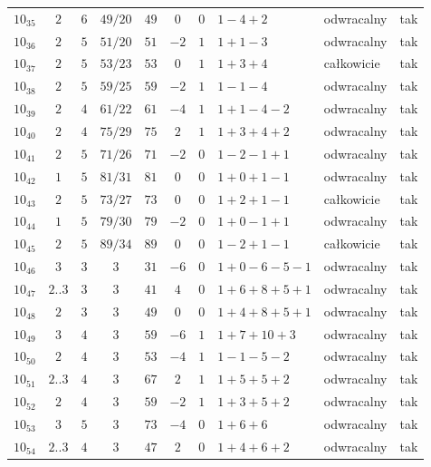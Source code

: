 \begin{longtable}{lccccccllc}
$10_{35}$  & $2$   & $6$ & $49/20$ & $49$  & $0$  & $0$ & $1-4+2$       & odwracalny & tak \\
$10_{36}$  & $2$   & $5$ & $51/20$ & $51$  & $-2$ & $1$ & $1+1-3$       & odwracalny & tak \\
$10_{37}$  & $2$   & $5$ & $53/23$ & $53$  & $0$  & $1$ & $1+3+4$       & całkowicie & tak \\
$10_{38}$  & $2$   & $5$ & $59/25$ & $59$  & $-2$ & $1$ & $1-1-4$       & odwracalny & tak \\
$10_{39}$  & $2$   & $4$ & $61/22$ & $61$  & $-4$ & $1$ & $1+1-4-2$     & odwracalny & tak \\
$10_{40}$  & $2$   & $4$ & $75/29$ & $75$  & $2$  & $1$ & $1+3+4+2$     & odwracalny & tak \\
$10_{41}$  & $2$   & $5$ & $71/26$ & $71$  & $-2$ & $0$ & $1-2-1+1$     & odwracalny & tak \\
$10_{42}$  & $1$   & $5$ & $81/31$ & $81$  & $0$  & $0$ & $1+0+1-1$     & odwracalny & tak \\
$10_{43}$  & $2$   & $5$ & $73/27$ & $73$  & $0$  & $0$ & $1+2+1-1$     & całkowicie & tak \\
$10_{44}$  & $1$   & $5$ & $79/30$ & $79$  & $-2$ & $0$ & $1+0-1+1$     & odwracalny & tak \\
$10_{45}$  & $2$   & $5$ & $89/34$ & $89$  & $0$  & $0$ & $1-2+1-1$     & całkowicie & tak \\
$10_{46}$  & $3$   & $3$ & $3$ & $31$  & $-6$ & $0$ & $1+0-6-5-1$   & odwracalny & tak \\
$10_{47}$  & $2..3$ & $3$ & $3$ & $41$  & $4$  & $0$ & $1+6+8+5+1$   & odwracalny & tak \\
$10_{48}$  & $2$   & $3$ & $3$ & $49$  & $0$  & $0$ & $1+4+8+5+1$   & odwracalny & tak \\
$10_{49}$  & $3$   & $4$ & $3$ & $59$  & $-6$ & $1$ & $1+7+10+3$    & odwracalny & tak \\
$10_{50}$  & $2$   & $4$ & $3$ & $53$  & $-4$ & $1$ & $1-1-5-2$     & odwracalny & tak \\
$10_{51}$  & $2..3$ & $4$ & $3$ & $67$  & $2$  & $1$ & $1+5+5+2$     & odwracalny & tak \\
$10_{52}$  & $2$   & $4$ & $3$ & $59$  & $-2$ & $1$ & $1+3+5+2$     & odwracalny & tak \\
$10_{53}$  & $3$   & $5$ & $3$ & $73$  & $-4$ & $0$ & $1+6+6$       & odwracalny & tak \\
$10_{54}$  & $2..3$ & $4$ & $3$ & $47$  & $2$  & $0$ & $1+4+6+2$     & odwracalny & tak \\

\end{longtable}
